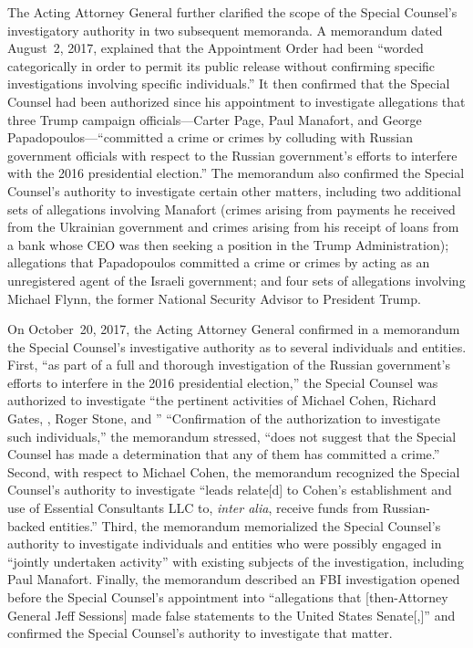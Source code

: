 The Acting Attorney General further clarified the scope of the Special Counsel's investigatory authority in two subsequent memoranda.
A memorandum dated August~2, 2017, explained that the Appointment Order had been ``worded categorically in order to permit its public release without confirming specific investigations involving specific individuals.''
It then confirmed that the Special Counsel had been authorized since his appointment to investigate allegations that three Trump campaign officials---Carter Page, Paul Manafort, and George Papadopoulos---``committed a crime or crimes by colluding with Russian government officials with respect to the Russian government's efforts to interfere with the 2016 presidential election.''
The memorandum also confirmed the Special Counsel's authority to investigate certain other matters, including two additional sets of allegations involving Manafort (crimes arising from payments he received from the Ukrainian government and crimes arising from his receipt of loans from a bank whose CEO was then seeking a position in the Trump Administration); allegations that Papadopoulos committed a crime or crimes by acting as an unregistered agent of the Israeli government; and four sets of allegations involving Michael Flynn, the former National Security Advisor to President Trump.

On October~20, 2017, the Acting Attorney General confirmed in a memorandum the Special Counsel's investigative authority as to several individuals and entities.
First, ``as part of a full and thorough investigation of the Russian government's efforts to interfere in the 2016 presidential election,'' the Special Counsel was authorized to investigate ``the pertinent activities of Michael Cohen, Richard Gates, , Roger Stone, and \thinspace\thinspace'' ``Confirmation of the authorization to investigate such individuals,'' the memorandum stressed, ``does not suggest that the Special Counsel has made a determination that any of them has committed a crime.''
Second, with respect to Michael Cohen, the memorandum recognized the Special Counsel's authority to investigate ``leads relate[d] to Cohen's establishment and use of Essential Consultants LLC to, \textit{inter alia}, receive funds from Russian-backed entities.''
Third, the memorandum memorialized the Special Counsel's authority to investigate individuals and entities who were possibly engaged in ``jointly undertaken activity'' with existing subjects of the investigation, including Paul Manafort.
Finally, the memorandum described an FBI investigation opened before the Special Counsel's appointment into ``allegations that [then-Attorney General Jeff Sessions] made false statements to the United States Senate[,]'' and confirmed the Special Counsel's authority to investigate that matter.


